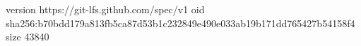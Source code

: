 version https://git-lfs.github.com/spec/v1
oid sha256:b70bdd179a813fb5ca87d53b1c232849e490e033ab19b171dd765427b54158f4
size 43840
